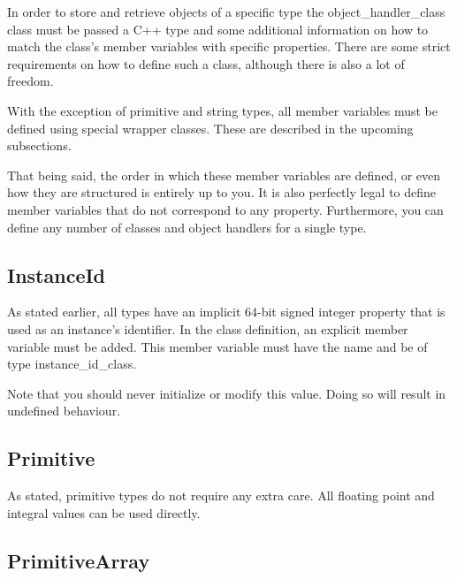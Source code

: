 In order to store and retrieve objects of a specific type the \gls{object_handler_class} class must be passed a C++ type and some additional information on how to match the class's member variables with specific properties. There are some strict requirements on how to define such a class, although there is also a lot of freedom.

With the exception of primitive and string types, all member variables must be defined using special wrapper classes. These are described in the upcoming subsections.

That being said, the order in which these member variables are defined, or even how they are structured is entirely up to you. It is also perfectly legal to define member variables that do not correspond to any property. Furthermore, you can define any number of classes and object handlers for a single type.

\subsection{InstanceId}
\label{section:member_types:instance_id}

As stated earlier, all types have an implicit 64-bit signed integer property that is used as an instance's identifier. In the class definition, an explicit member variable must be added. This member variable must have the name  and be of type \gls{instance_id_class}.



Note that you should never initialize or modify this value. Doing so will result in undefined behaviour.

\subsection{Primitive}
\label{section:member_types:primitive}

As stated, primitive types do not require any extra care. All floating point and integral values can be used directly.





\subsection{PrimitiveArray}
\label{section:member_types:primitive_array}

